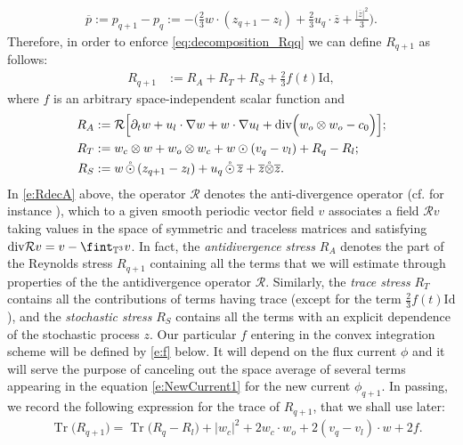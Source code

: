 \documentclass[10pt,a4paper]{amsart}
\numberwithin{equation}{section}
\numberwithin{corollario}{section}
\numberwithin{lemma}{section}
\numberwithin{prop}{section}
\theoremstyle{definition}
\theoremstyle{remark}
\newcommand{\T}{\mathbb{T}}
\newcommand{\dvg}{\mathord{{\rm div}}}
\newcommand{\Id}{\mathrm{Id}}
\newcommand{\varz}{\overline{z}}
\newcommand{\varp}{\overline{p}}
\newcommand{\AntiDiv}{\mathcal{R}}
\DeclareMathOperator{\Tr}{Tr}
\newcommand{\qq}{_{q+1}}
\newcommand{\SymOt}{\odot}
\newcommand{\SymOtNoTr}{\,\mathring{\odot}\,}
\begin{document}
\begin{align}
  \label{e:varp} \varp:=p\qq-p_{q}:=-\Big(\frac{2}{3}w\cdot (z\qq-z_l)+\frac{2}{3}u_q\cdot \varz +\frac{|\varz|^2}{3}\Big).
\end{align}
Therefore, in order to enforce \eqref{eq:decomposition_Rqq} we can define $R_{q+1}$ as follows: 
\begin{align}\label{e:Rdec}
       R\qq
       &:=
       R_A+R_T+R_S+\frac{2}{3}f(t)\Id,
       \end{align}
where $f$ is an arbitrary space-independent scalar function and 
       \begin{align}\label{e:RdecA}
       R_A&:=\AntiDiv\Big[ \partial_t w+u_l\cdot \nabla w+w\cdot \nabla u_l +\dvg\Big(w_o\otimes w_o-c_0\Big) \Big];
       \\
       \label{e:RdecT}
       R_T&:= w_c\otimes w+w_o\otimes w_c+w\SymOt (v_q-v_l)+R_q-R_l ;
       \\
       \label{e:RdecS}
       R_S&:= w\SymOtNoTr (z\qq-z_l)+u_q\SymOtNoTr \varz+\varz\mathring{\otimes} \varz .
\end{align}
In \eqref{e:RdecA} above, the operator $\mathcal{R}$ denotes the anti-divergence operator (cf. for instance \cite[Definition 4.2]{DLS13}), which to a given smooth periodic vector field $v$ associates a field $\mathcal{R}v$ taking values in the space of symmetric and traceless matrices and satisfying $\dvg \mathcal{R}v = v - \fint_{\T^3}v$. 
In fact, the \emph{antidivergence stress} $R_A$ denotes the part of the Reynolds stress $R\qq$ containing all the terms that we will estimate through properties of the the antidivergence operator $\mathcal{R}$.
Similarly, the \emph{trace stress} $R_T$ contains all the contributions of terms having trace (except for the term $\frac{2}{3}f(t)\Id$), and the \emph{stochastic stress}  $R_S$ contains all the terms with an explicit dependence of the stochastic process $z$.
Our particular $f$ entering in the convex integration scheme will be defined by \eqref{e:f} below. 
It will depend on the flux current $\phi$ and it will serve the purpose of canceling out the space average of several terms appearing in the equation \eqref{e:NewCurrent1} for the new current $\phi\qq$.  
In passing, we record the following expression for the trace of $R_{q+1}$, that we shall use later:
\begin{align}
   &\label{e:TraceR}\Tr\big(R\qq\big)=\Tr\big(R_q-R_l\big)+|w_c|^2+2w_c\cdot w_o+2(v_q-v_l)\cdot w+2f.
\end{align}
\end{document}
